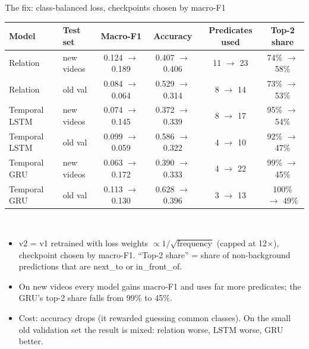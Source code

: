 \documentclass[aspectratio=169,11pt]{beamer}
\begin{document}
\begin{frame}[t]{The fix: class-balanced loss, checkpoints chosen by macro-F1}
  \centering\vspace{0.2cm}\scriptsize\setlength{\tabcolsep}{3.5pt}
  \begin{tabular}{llcccc}
    \toprule
    Model & Test set & Macro-F1 & Accuracy & Predicates used & Top-2 share\\
    \midrule
    Relation & new videos & 0.124 $\rightarrow$ 0.189 & 0.407 $\rightarrow$ 0.406 & 11 $\rightarrow$ 23 & 74\% $\rightarrow$ 58\%\\
    Relation & old val & 0.084 $\rightarrow$ 0.064 & 0.529 $\rightarrow$ 0.314 & 8 $\rightarrow$ 14 & 73\% $\rightarrow$ 53\%\\
    Temporal LSTM & new videos & 0.074 $\rightarrow$ 0.145 & 0.372 $\rightarrow$ 0.339 & 8 $\rightarrow$ 17 & 95\% $\rightarrow$ 54\%\\
    Temporal LSTM & old val & 0.099 $\rightarrow$ 0.059 & 0.586 $\rightarrow$ 0.322 & 4 $\rightarrow$ 10 & 92\% $\rightarrow$ 47\%\\
    Temporal GRU & new videos & 0.063 $\rightarrow$ 0.172 & 0.390 $\rightarrow$ 0.333 & 4 $\rightarrow$ 22 & 99\% $\rightarrow$ 45\%\\
    Temporal GRU & old val & 0.113 $\rightarrow$ 0.130 & 0.628 $\rightarrow$ 0.396 & 3 $\rightarrow$ 13 & 100\% $\rightarrow$ 49\%\\
    \bottomrule
  \end{tabular}\\[6pt]
  \begin{minipage}{0.93\textwidth}\scriptsize
  \begin{itemize}\setlength\itemsep{1pt}
    \item v2 = v1 retrained with loss weights $\propto 1/\sqrt{\mathrm{frequency}}$ (capped at 12$\times$), checkpoint chosen by macro-F1. ``Top-2 share'' = share of non-background predictions that are next\_to or in\_front\_of.
    \item On new videos every model gains macro-F1 and uses far more predicates; the GRU's top-2 share falls from 99\% to 45\%.
    \item Cost: accuracy drops (it rewarded guessing common classes). On the small old validation set the result is mixed: relation worse, LSTM worse, GRU better.
  \end{itemize}
  \end{minipage}
\end{frame}
\end{document}
